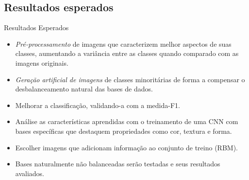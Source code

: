 \documentclass{beamer}
\begin{document}
\subsection{Resultados esperados}
\begin{frame}{Resultados Esperados}
\setlength\leftmargini{0em}

\begin{itemize}
\item \textit{Pré-processamento} de imagens que caracterizem melhor aspectos de suas classes, aumentando a variância entre as classes quando comparado com as imagens originais.
\item \textit{Geração artificial de imagens} de classes minoritárias de forma a compensar o desbalanceamento natural das bases de dados.
\item Melhorar a classificação, validando-a com a medida-F1. 
\item Análise as características aprendidas com o treinamento de uma CNN com bases específicas que destaquem propriedades como cor, textura e forma. 
\item Escolher imagens que adicionam informação ao conjunto de treino (RBM).
\item Bases naturalmente não balanceadas serão testadas e seus resultados avaliados.
\end{itemize}




\end{frame}
\end{document}
